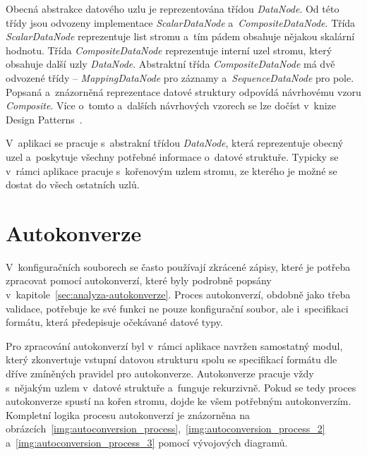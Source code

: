 \documentclass[FM,bw,DP]{tulthesis}
\begin{document}
Obecná abstrakce datového uzlu je reprezentována třídou \textit{DataNode}. Od této třídy jsou odvozeny implementace \textit{ScalarDataNode} a~\textit{CompositeDataNode}. Třída \textit{ScalarDataNode} reprezentuje list stromu a~tím pádem obsahuje nějakou skalární hodnotu. Třída \textit{CompositeDataNode} reprezentuje interní uzel stromu, který obsahuje další uzly \textit{DataNode}. Abstraktní třída \textit{CompositeDataNode} má dvě odvozené třídy -- \textit{MappingDataNode} pro záznamy a~\textit{SequenceDataNode} pro pole. Popsaná a~znázorněná reprezentace datové struktury odpovídá návrhovému vzoru \textit{Composite}. Více o~tomto a~dalších návrhových vzorech se lze dočíst v~knize Design Patterns~\cite{bib:design-patterns}.

V~aplikaci se pracuje s~abstrakní třídou \textit{DataNode}, která reprezentuje obecný uzel a~poskytuje všechny potřebné informace o~datové struktuře. Typicky se v~rámci aplikace pracuje s~kořenovým uzlem stromu, ze kterého je možné se dostat do všech ostatních uzlů.

\section{Autokonverze}
\label{sec:navrh-autokonverze}

V~konfiguračních souborech se často používají zkrácené zápisy, které je potřeba zpracovat pomocí autokonverzí, které byly podrobně popsány v~kapitole~\ref{sec:analyza-autokonverze}. Proces autokonverzí, obdobně jako třeba validace, potřebuje ke své funkci ne pouze konfigurační soubor, ale i~specifikaci formátu, která předepisuje očekávané datové typy.

Pro zpracování autokonverzí byl v~rámci aplikace navržen samostatný modul, který zkonvertuje vstupní datovou strukturu spolu se specifikací formátu dle dříve zmíněných pravidel pro autokonverze. Autokonverze pracuje vždy s~nějakým uzlem v~datové struktuře a~funguje rekurzivně. Pokud se tedy proces autokonverze spustí na kořen stromu, dojde ke všem potřebným autokonverzím. Kompletní logika procesu autokonverzí je znázorněna na obrázcích~\ref{img:autoconversion_process},~\ref{img:autoconversion_process_2}  a~\ref{img:autoconversion_process_3} pomocí vývojových diagramů. 
\end{document}

